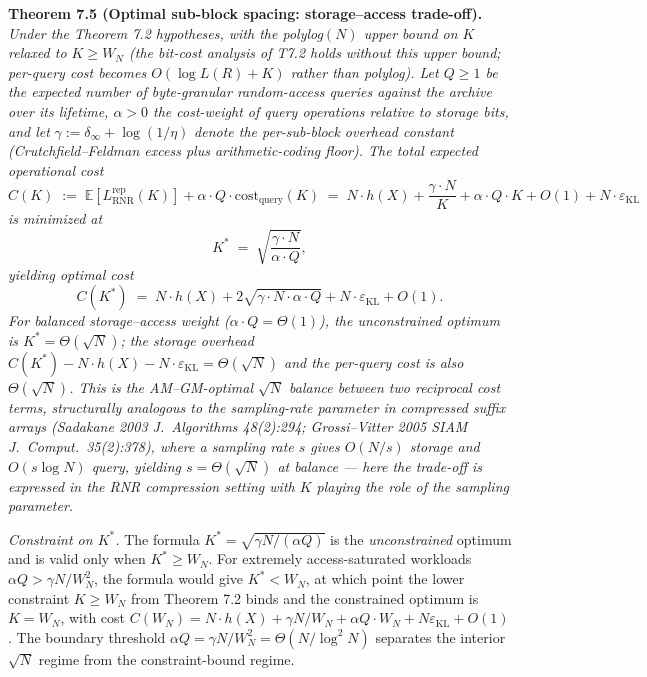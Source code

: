\documentclass[
]{article}
\begin{document}
\textbf{Theorem 7.5 (Optimal sub-block spacing: storage--access
trade-off).} \emph{Under the Theorem 7.2 hypotheses, with the
polylog$(N)$ upper bound on $K$ relaxed to $K \geq W_N$ (the bit-cost
analysis of T7.2 holds without this upper bound; per-query cost
becomes $O(\log L(R) + K)$ rather than polylog). Let $Q \geq 1$ be
the expected number of byte-granular random-access queries against
the archive over its lifetime, $\alpha > 0$ the cost-weight of query
operations relative to storage bits, and let}
$\gamma := \delta_\infty + \log(1/\eta)$
\emph{denote the per-sub-block overhead constant (Crutchfield--Feldman
excess plus arithmetic-coding floor). The total expected operational
cost}
\[
C(K) \;:=\; \mathbb{E}[L^{\mathrm{rep}}_{\mathrm{RNR}}(K)]
        + \alpha \cdot Q \cdot \mathrm{cost}_{\mathrm{query}}(K)
       \;=\; N \cdot h(X) + \frac{\gamma \cdot N}{K} + \alpha \cdot Q \cdot K + O(1) + N \cdot \varepsilon_{\mathrm{KL}}
\]
\emph{is minimized at}
\[
K^* \;=\; \sqrt{\frac{\gamma \cdot N}{\alpha \cdot Q}},
\]
\emph{yielding optimal cost}
\[
C(K^*) \;=\; N \cdot h(X) + 2 \sqrt{\gamma \cdot N \cdot \alpha \cdot Q}
            + N \cdot \varepsilon_{\mathrm{KL}} + O(1).
\]
\emph{For balanced storage--access weight ($\alpha \cdot Q = \Theta(1)$),
the unconstrained optimum is $K^* = \Theta(\sqrt{N})$; the storage
overhead $C(K^*) - N \cdot h(X) - N \cdot \varepsilon_{\mathrm{KL}} =
\Theta(\sqrt{N})$ and the per-query cost is also $\Theta(\sqrt{N})$.
This is the AM--GM-optimal $\sqrt{N}$ balance between two reciprocal
cost terms, structurally analogous to the sampling-rate parameter in
compressed suffix arrays (Sadakane 2003 \emph{J.\ Algorithms} 48(2):294;
Grossi--Vitter 2005 \emph{SIAM J.\ Comput.}\ 35(2):378), where a
sampling rate $s$ gives $O(N/s)$ storage and $O(s \log N)$ query, yielding
$s = \Theta(\sqrt{N})$ at balance --- here the trade-off is expressed
in the RNR compression setting with $K$ playing the role of the
sampling parameter.}

\emph{Constraint on $K^*$.} The formula $K^* = \sqrt{\gamma N / (\alpha Q)}$
is the \emph{unconstrained} optimum and is valid only when $K^* \geq W_N$.
For extremely access-saturated workloads $\alpha Q > \gamma N / W_N^2$,
the formula would give $K^* < W_N$, at which point the lower constraint
$K \geq W_N$ from Theorem 7.2 binds and the constrained optimum is
$K = W_N$, with cost $C(W_N) = N \cdot h(X) + \gamma N / W_N +
\alpha Q \cdot W_N + N \varepsilon_{\mathrm{KL}} + O(1)$. The boundary
threshold $\alpha Q = \gamma N / W_N^2 = \Theta(N / \log^2 N)$ separates
the interior $\sqrt{N}$ regime from the constraint-bound regime.
\end{document}
